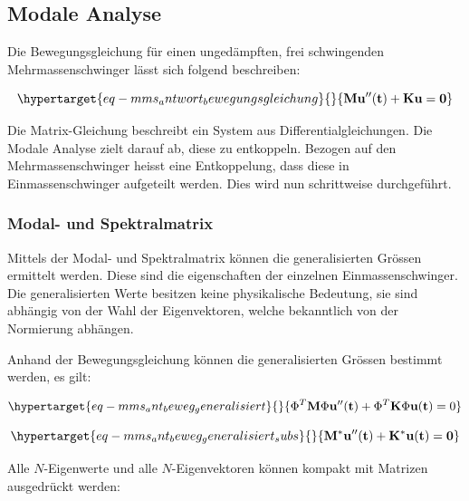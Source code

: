 \documentclass[
  letterpaper,
  DIV=11]{scrreprt}
\begin{document}
\hypertarget{modale-analyse-2}{%
\subsection{Modale Analyse}\label{modale-analyse-2}}

Die Bewegungsgleichung für einen ungedämpften, frei schwingenden
Mehrmassenschwinger lässt sich folgend beschreiben:

\begin{equation}\protect\hypertarget{eq-mms_antwort_bewegungsgleichung}{}{
\mathbf{M u''(t) + K u = 0}
}\label{eq-mms_antwort_bewegungsgleichung}\end{equation}

Die Matrix-Gleichung beschreibt ein System aus Differentialgleichungen.
Die Modale Analyse zielt darauf ab, diese zu entkoppeln. Bezogen auf den
Mehrmassenschwinger heisst eine Entkoppelung, dass diese in
Einmassenschwinger aufgeteilt werden. Dies wird nun schrittweise
durchgeführt.

\hypertarget{modal--und-spektralmatrix-2}{%
\subsubsection{Modal- und
Spektralmatrix}\label{modal--und-spektralmatrix-2}}

Mittels der Modal- und Spektralmatrix können die generalisierten Grössen
ermittelt werden. Diese sind die eigenschaften der einzelnen
Einmassenschwinger. Die generalisierten Werte besitzen keine
physikalische Bedeutung, sie sind abhängig von der Wahl der
Eigenvektoren, welche bekanntlich von der Normierung abhängen.

Anhand der Bewegungsgleichung können die generalisierten Grössen
bestimmt werden, es gilt:

\begin{equation}\protect\hypertarget{eq-mms_ant_beweg_generalisiert}{}{
\Phi^T\mathbf{ M} \Phi \mathbf{u''(t)} + \Phi^T \mathbf{K} \Phi \mathbf{u(t)} = 0
}\label{eq-mms_ant_beweg_generalisiert}\end{equation}

\begin{equation}\protect\hypertarget{eq-mms_ant_beweg_generalisiert_subs}{}{
\mathbf{M^*u''(t) + K^* u(t) = 0}
}\label{eq-mms_ant_beweg_generalisiert_subs}\end{equation}

Alle \(N\)-Eigenwerte und alle \(N\)-Eigenvektoren können kompakt mit
Matrizen ausgedrückt werden:
\end{document}
